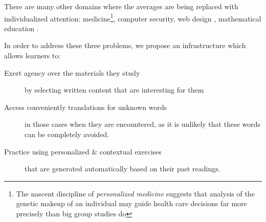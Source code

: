 There are many other domains where the averages are being replaced with individualized attention: medicine\footnote{The nascent discipline of {\em personalized medicine} suggests that analysis of the genetic makeup of an individual may guide health care decisions far more precisely than big group studies do}, computer security,  web design \cite{Reinecke13-CulturalAdaptation}, mathematical education \cite{Polozov15-AdaptableMath}. 



In order to address these three problems, we propose an infrastructure which allows learners to: 

	\begin{description}
	
		\item [Exert agency over the materials they study] by selecting written content that are interesting for them
	
		\item [Access conveniently translations for unknown words] in those cases when they are encountered, as it is unlikely that these words can be completely avoided.

		\item [Practice using personalized \& contextual exercises] that are generated automatically based on their past readings.

	\end{description}



